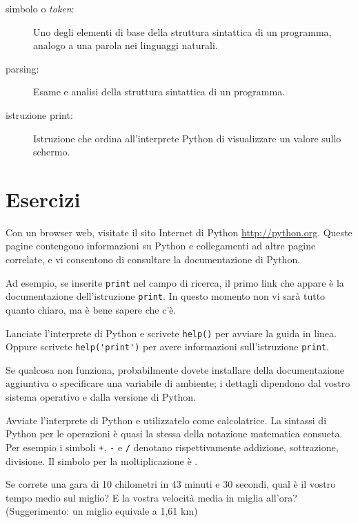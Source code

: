 \documentclass[10pt]{book}
\begin{document}
\begin{description}
\item[simbolo o {\em token}:]  Uno degli elementi di base della struttura sintattica di un programma, analogo a una parola nei linguaggi naturali.

\item[parsing:]  Esame e analisi della struttura sintattica di un programma.

\item[istruzione print:]  Istruzione che ordina all'interprete Python di visualizzare un valore sullo schermo.


\end{description}


\section{Esercizi}

\begin{exercise}

Con un browser web, visitate il sito Internet di Python \url{http://python.org}.
Queste pagine contengono informazioni su Python e collegamenti ad altre pagine correlate, e vi consentono di consultare la documentazione di Python.

Ad esempio, se inserite {\tt print} nel campo di ricerca, il primo link che appare è la documentazione dell'istruzione {\tt print}. In questo momento non vi sarà tutto quanto chiaro, ma è bene sapere che c'è.

\end{exercise}

\begin{exercise}

Lanciate l'interprete di Python e scrivete {\tt help()} per avviare la guida in linea. Oppure scrivete \verb"help('print')" per avere informazioni sull'istruzione {\tt print}.

Se qualcosa non funziona, probabilmente dovete installare della documentazione aggiuntiva o specificare una variabile di ambiente; i dettagli dipendono dal vostro sistema operativo e dalla versione di Python.

\end{exercise}

\vspace{0.2in}
\begin{exercise}

Avviate l'interprete di Python e utilizzatelo come calcolatrice. La sintassi di Python per le operazioni è quasi la stessa della notazione matematica consueta. Per esempio i simboli {\tt +}, {\tt -} e {\tt /} denotano rispettivamente addizione, sottrazione, divisione. Il simbolo per la moltiplicazione è {\tt *}.

Se correte una gara di 10 chilometri in 43 minuti e 30 secondi, qual è il vostro tempo medio sul miglio? E la vostra velocità media in miglia all'ora? (Suggerimento: un miglio equivale a 1,61 km)

\end{exercise}
\end{document}
